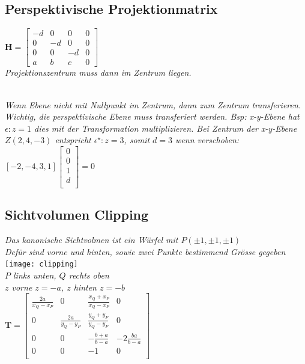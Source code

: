 \subsection{Perspektivische Projektionmatrix}

$\mathbf{H} = \begin{bmatrix}
    -d & 0 & 0 & 0 \\
    0 & -d & 0 & 0 \\
    0 & 0 & -d & 0 \\
    a & b & c & 0
\end{bmatrix}$ \\

\textit{Projektionszentrum muss dann im Zentrum liegen.}

\textit{\\
    Wenn Ebene nicht mit Nullpunkt im Zentrum, dann zum Zentrum transferieren.
    Wichtig, die perspektivische Ebene muss transferiert werden. Bsp: x-y-Ebene hat $\epsilon: z = 1$
    dies mit der Transformation multiplizieren. Bei Zentrum der x-y-Ebene $Z(2,4,-3)$ entspricht
    $\epsilon^\star: z = 3$, somit $d = 3$ wenn verschoben:
}
$[-2, -4, 3, 1] \begin{bmatrix}
    0 \\ 0 \\ 1 \\ d \\
\end{bmatrix} = 0$ \\

\subsection{Sichtvolumen Clipping}

\textit{Das kanonische Sichtvolmen ist ein Würfel mit $P(\pm 1, \pm 1, \pm 1)$} \\
\textit{Defür sind vorne und hinten, sowie zwei Punkte bestimmend Grösse gegeben} \\

\texttt{[image: clipping]} \\

\textit{$P$ links unten, $Q$ rechts oben} \\
\textit{$z$ vorne $z=-a$, $z$ hinten $z=-b$} \\

$\mathbf{T} = \begin{bmatrix}
    \frac{2a}{x_Q - x_P} & 0 & \frac{x_Q + x_P}{x_Q - x_P} & 0 \\
    0 & \frac{2a}{y_Q - y_P} & \frac{y_Q + y_P}{y_Q - y_P} & 0 \\
    0 & 0 & -\frac{b+a}{b-a} & -2\frac{ba}{b-a} \\
    0 & 0 & -1 & 0 \\
\end{bmatrix}$